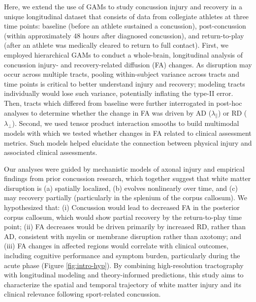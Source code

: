 \documentclass[12pt]{article}
\begin{document}
Here, we extend the use of GAMs to study concussion injury and recovery in a unique longitudinal dataset that consists of data from collegiate athletes at three time points: baseline (before an athlete sustained a concussion), post-concussion (within approximately 48 hours after diagnosed concussion), and return-to-play (after an athlete was medically cleared to return to full contact). First, we employed hierarchical GAMs to conduct a whole-brain, longitudinal analysis of concussion injury- and recovery-related diffusion (FA) changes. As disruption may occur across multiple tracts, pooling within-subject variance across tracts and time points is critical to better understand injury and recovery; modeling tracts individually would lose such variance, potentially inflating the type-II error. Then, tracts which differed from baseline were further interrogated in post-hoc analyses to determine whether the change in FA was driven by AD ($\lambda_\parallel$) or RD ($\lambda_\perp$). Second, we used tensor product interaction smooths to build multimodal models with which we tested whether changes in FA related to clinical assessment metrics. Such models helped elucidate the connection between physical injury and associated clinical assessments.

Our analyses were guided by mechanistic models of axonal injury and empirical findings from prior concussion research, which together suggest that white matter disruption is (a) spatially localized, (b) evolves nonlinearly over time, and (c) may recovery partially (particularly in the splenium of the corpus callosum). We hypothesized that: (i) Concussion would lead to decreased FA in the posterior corpus callosum, which would show partial recovery by the return-to-play time point; (ii) FA decreases would be driven primarily by increased RD, rather than AD, consistent with myelin or membrane disruption rather than axotomy; and (iii) FA changes in affected regions would correlate with clinical outcomes, including cognitive performance and symptom burden, particularly during the acute phase (Figure \ref{fig:intro-hyp}). By combining high-resolution tractography with longitudinal modeling and theory-informed predictions, this study aims to characterize the spatial and temporal trajectory of white matter injury and its clinical relevance following sport-related concussion.
\end{document}

